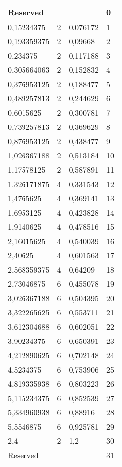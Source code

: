 \begin{longtable}{|l|l|l|l|}
\multicolumn{3}{|l|}{Reserved}  & 0 \\  \hline
    0,15234375     & 2  & 0,076172 & 1       \\ \hline
    0,193359375    & 2  & 0,09668  & 2       \\ \hline
    0,234375       & 2  & 0,117188 & 3       \\ \hline
    0,305664063    & 2  & 0,152832 & 4       \\ \hline
    0,376953125    & 2  & 0,188477 & 5       \\ \hline
    0,489257813    & 2  & 0,244629 & 6       \\ \hline
    0,6015625      & 2  & 0,300781 & 7       \\ \hline
    0,739257813    & 2  & 0,369629 & 8       \\ \hline
    0,876953125    & 2  & 0,438477 & 9       \\ \hline
    1,026367188    & 2  & 0,513184 & 10      \\ \hline
    1,17578125     & 2  & 0,587891 & 11      \\ \hline
    1,326171875    & 4  & 0,331543 & 12      \\ \hline
    1,4765625      & 4  & 0,369141 & 13      \\ \hline
    1,6953125      & 4  & 0,423828 & 14      \\ \hline
    1,9140625      & 4  & 0,478516 & 15      \\ \hline
    2,16015625     & 4  & 0,540039 & 16      \\ \hline
    2,40625        & 4  & 0,601563 & 17      \\ \hline
    2,568359375    & 4  & 0,64209  & 18      \\ \hline
    2,73046875     & 6  & 0,455078 & 19      \\ \hline
    3,026367188    & 6  & 0,504395 & 20      \\ \hline
    3,322265625    & 6  & 0,553711 & 21      \\ \hline
    3,612304688    & 6  & 0,602051 & 22      \\ \hline
    3,90234375     & 6  & 0,650391 & 23      \\ \hline
    4,212890625    & 6  & 0,702148 & 24      \\ \hline
    4,5234375      & 6  & 0,753906 & 25      \\ \hline
    4,819335938    & 6  & 0,803223 & 26      \\ \hline
    5,115234375    & 6  & 0,852539 & 27      \\ \hline
    5,334960938    & 6  & 0,88916  & 28      \\ \hline
    5,5546875      & 6  & 0,925781 & 29      \\ \hline
    2,4            & 2  & 1,2      & 30      \\ \hline
\multicolumn{3}{|l|}{Reserved}  & 31 \\  \hline
    \end{longtable}




